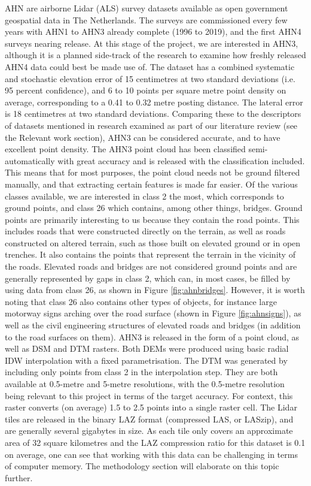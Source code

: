 AHN are airborne Lidar (ALS) survey datasets available as open government geospatial data in The Netherlands. The surveys are commissioned every few years with AHN1 to AHN3 already complete (1996 to 2019), and the first AHN4 surveys nearing release. At this stage of the project, we are interested in AHN3, although it is a planned side-track of the research to examine how freshly released AHN4 data could best be made use of. The dataset has a combined systematic and stochastic elevation error of 15 centimetres at two standard deviations (i.e. 95 percent confidence), and 6 to 10 points per square metre point density on average, corresponding to a 0.41 to 0.32 metre posting distance. The lateral error is 18 centimetres at two standard deviations. Comparing these to the descriptors of datasets mentioned in research examined as part of our literature review (see the Relevant work section), AHN3 can be considered accurate, and to have excellent point density. The AHN3 point cloud has been classified semi-automatically with great accuracy and is released with the classification included. This means that for most purposes, the point cloud needs not be ground filtered manually, and that extracting certain features is made far easier. Of the various classes available, we are interested in class 2 the most, which corresponds to ground points, and class 26 which contains, among other things, bridges. Ground points are primarily interesting to us because they contain the road points. This includes roads that were constructed directly on the terrain, as well as roads constructed on altered terrain, such as those built on elevated ground or in open trenches. It also contains the points that represent the terrain in the vicinity of the roads. Elevated roads and bridges are not considered ground points and are generally represented by gaps in class 2, which can, in most cases, be filled by using data from class 26, as shown in Figure \ref{fig:ahnbridges}. However, it is worth noting that class 26 also contains other types of objects, for instance large motorway signs arching over the road surface (shown in Figure \ref{fig:ahnsigns}), as well as the civil engineering structures of elevated roads and bridges (in addition to the road surfaces on them). AHN3 is released in the form of a point cloud, as well as DSM and DTM rasters. Both DEMs were produced using basic radial IDW interpolation with a fixed parametrisation. The DTM was generated by including only points from class 2 in the interpolation step. They are both available at 0.5-metre and 5-metre resolutions, with the 0.5-metre resolution being relevant to this project in terms of the target accuracy. For context, this raster converts (on average) 1.5 to 2.5 points into a single raster cell. The Lidar tiles are released in the binary LAZ format (compressed LAS, or LASzip), and are generally several gigabytes in size. As each tile only covers an approximate area of 32 square kilometres and the LAZ compression ratio for this dataset is 0.1 on average, one can see that working with this data can be challenging in terms of computer memory. The methodology section will elaborate on this topic further.

